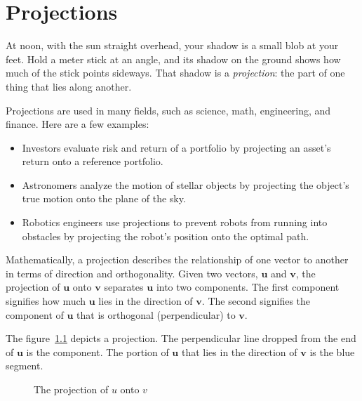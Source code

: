 \chapter{Projections}

At noon, with the sun straight overhead, your shadow is a small blob at your
feet. Hold a meter stick at an angle, and its shadow on the ground shows how
much of the stick points sideways. That shadow is a \emph{projection}: the
part of one thing that lies along another.

Projections are used in many fields, such as science, math, engineering, and finance. Here are a few examples: 
\begin{itemize}
\item Investors evaluate risk and return of a portfolio by projecting an asset’s return onto a reference portfolio.
\item Astronomers analyze the motion of stellar objects by projecting the object’s true motion onto the plane of the sky.
\item Robotics engineers use projections to prevent robots from running into obstacles by projecting the robot’s position onto the optimal path.
\end{itemize}

Mathematically, a projection describes the relationship of one vector to another in terms of direction and orthogonality. Given two vectors, $\mathbf{u}$ and $\mathbf{v}$, the projection of $\mathbf{u}$ onto $\mathbf{v}$ separates $\mathbf{u}$ into two components. The first component signifies how much $\mathbf{u}$ lies in the direction of $\mathbf{v}$. The second signifies the component of $\mathbf{u}$ that is orthogonal (perpendicular) to $\mathbf{v}$.  

The figure~\ref{fig:projection} depicts a projection. The perpendicular line dropped from the end of $\mathbf{u}$ is the  component. The portion of $\mathbf{u}$ that lies in the direction of $\mathbf{v}$ is the blue segment. 
\begin{figure}[H]
    \centering
    \caption{The projection of $u$ onto $v$}
    \label{fig:projection}
\end{figure}

